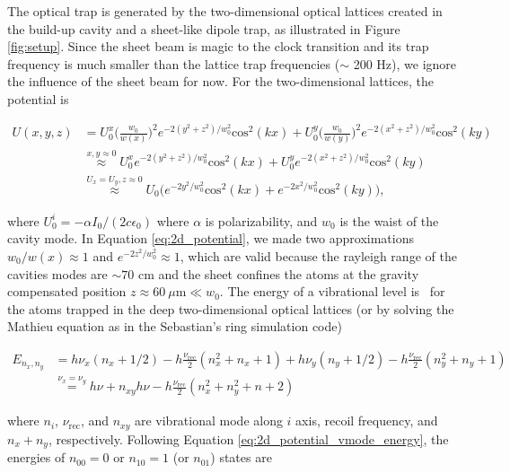 \documentclass[bibnotes]{article}
\begin{document}
	The optical trap is generated by the two-dimensional optical lattices created in the build-up cavity and a sheet-like dipole trap, as illustrated in Figure \ref{fig:setup}. Since the sheet beam is magic to the clock transition and its trap frequency is much smaller than the lattice trap frequencies ($\sim$ 200 Hz), we ignore the influence of the sheet beam for now. For the two-dimensional lattices, the potential is

	\begin{align}
	U(x,y,z)&=U^{x}_{0}\bigg(\frac{w_{0}}{w(x)}\bigg)^{2}e^{-2(y^{2}+z^{2})/w^{2}_{0}}\text{cos}^{2}(kx)+U^{y}_{0}\bigg(\frac{w_{0}}{w(y)}\bigg)^{2}e^{-2(x^{2}+z^{2})/w^{2}_{0}}\text{cos}^{2}(ky) \nonumber \\
	&\stackrel{x,y \approx 0}{\approx} U^{x}_{0}e^{-2(y^{2}+z^{2})/w^{2}_{0}}\text{cos}^{2}(kx)+U^{y}_{0}e^{-2(x^{2}+z^{2})/w^{2}_{0}}\text{cos}^{2}(ky) \nonumber\\
	&\stackrel{U_{x}=U_{y}, z\approx{0}}{\approx} U_{0}\bigg(e^{-2y^{2}/w^{2}_{0}}\text{cos}^{2}(kx)+e^{-2x^{2}/w^{2}_{0}}\text{cos}^{2}(ky)\bigg),
	\label{eq:2d_potential}
	\end{align}

	\noindent where $U^{i}_{0} = - \alpha I_{0} / (2c\epsilon_{0})$ where $\alpha$ is polarizability, and $w_{0}$ is the waist of the cavity mode. In Equation \ref{eq:2d_potential}, we made two approximations $w_{0}/w(x)\approx1$ and $e^{-2z^{2}/w^{2}_{0}}\approx 1$, which are valid because the rayleigh range of the cavities modes are $\sim 70$ cm and the sheet confines the atoms at the gravity compensated position $z\approx 60 \ \mu \text{m} \ll  w_{0}$. The energy of a vibrational level is~\cite{blatt09} for the atoms trapped in the deep two-dimensional optical lattices (or by solving the Mathieu equation as in the Sebastian's ring simulation code)

	\begin{align}\label{eq:2d_potential_vmode_energy}
	E_{n_x,n_y}&=h\nu_{x}(n_{x}+1/2)-h\frac{\nu_{\text{rec}}}{2}(n^{2}_{x}+n_{x}+1)
	+h\nu_{y}(n_{y}+1/2)-h\frac{\nu_{\text{rec}}}{2}(n^{2}_{y}+n_{y}+1) \nonumber\\
	&\stackrel{\nu_x=\nu_y}=h\nu + n_{xy}h\nu - h\frac{\nu_{\text{rec}}}{2}(n^{2}_x+n^{2}_y+n+2)
	\end{align}

	\noindent where $n_{i}$, $\nu_{\text{rec}}$, and $n_{xy}$ are vibrational mode along $i$ axis, recoil frequency, and $n_x+n_y$, respectively. Following Equation \ref{eq:2d_potential_vmode_energy}, the energies of $n_{00}=0$ or $n_{10}=1$ (or $n_{01}$) states are
\end{document}
